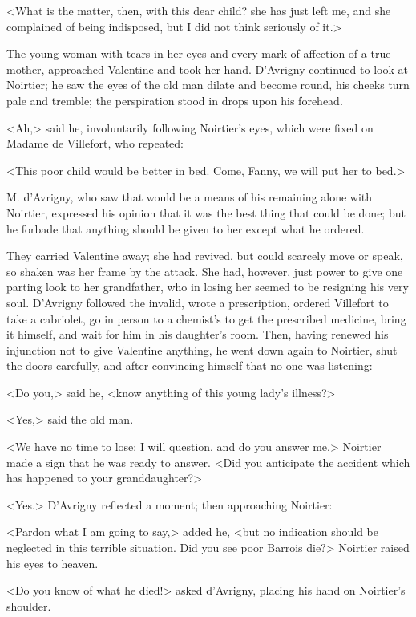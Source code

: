  <What is the matter, then, with this dear child? she has just left me, and she complained of being indisposed, but I did not think seriously of it.> 

 The young woman with tears in her eyes and every mark of affection of a true mother, approached Valentine and took her hand. D'Avrigny continued to look at Noirtier; he saw the eyes of the old man dilate and become round, his cheeks turn pale and tremble; the perspiration stood in drops upon his forehead. 

 <Ah,> said he, involuntarily following Noirtier's eyes, which were fixed on Madame de Villefort, who repeated: 

 <This poor child would be better in bed. Come, Fanny, we will put her to bed.> 

 M. d'Avrigny, who saw that would be a means of his remaining alone with Noirtier, expressed his opinion that it was the best thing that could be done; but he forbade that anything should be given to her except what he ordered. 

 They carried Valentine away; she had revived, but could scarcely move or speak, so shaken was her frame by the attack. She had, however, just power to give one parting look to her grandfather, who in losing her seemed to be resigning his very soul. D'Avrigny followed the invalid, wrote a prescription, ordered Villefort to take a cabriolet, go in person to a chemist's to get the prescribed medicine, bring it himself, and wait for him in his daughter's room. Then, having renewed his injunction not to give Valentine anything, he went down again to Noirtier, shut the doors carefully, and after convincing himself that no one was listening: 

 <Do you,> said he, <know anything of this young lady's illness?> 

 <Yes,> said the old man. 

 <We have no time to lose; I will question, and do you answer me.> Noirtier made a sign that he was ready to answer. <Did you anticipate the accident which has happened to your granddaughter?> 

 <Yes.> D'Avrigny reflected a moment; then approaching Noirtier: 

 <Pardon what I am going to say,> added he, <but no indication should be neglected in this terrible situation. Did you see poor Barrois die?> Noirtier raised his eyes to heaven. 

 <Do you know of what he died!> asked d'Avrigny, placing his hand on Noirtier's shoulder. 

